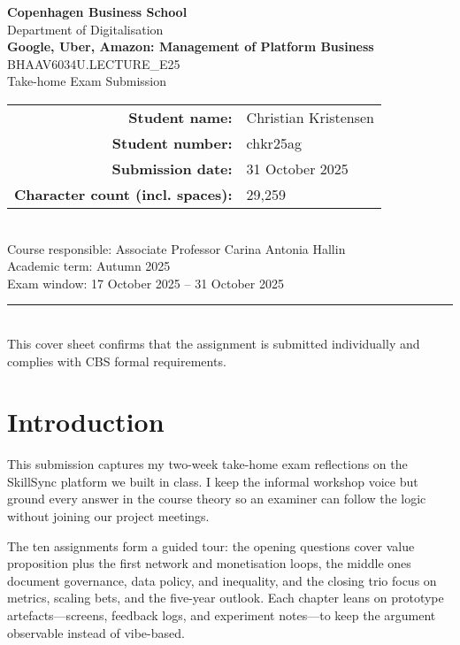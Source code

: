 \documentclass[12pt,a4paper]{article}
\newcommand{\university}{Copenhagen Business School}
\newcommand{\faculty}{Department of Digitalisation}
\newcommand{\examTitle}{Google, Uber, Amazon: Management of Platform Business}
\newcommand{\examCode}{BHAAV6034U.LECTURE\_E25}
\newcommand{\examType}{Take-home Exam Submission}
\newcommand{\studentName}{Christian Kristensen}
\newcommand{\studentId}{chkr25ag}
\newcommand{\submissionDate}{31 October 2025}
\newcommand{\wordCount}{29,259}
\begin{document}
\begin{titlepage}
  \thispagestyle{empty}
  \centering
  {\Large \textbf{\university}}\\[0.5cm]
  {\large \faculty}\\[1.5cm]
  {\LARGE \textbf{\examTitle}}\\[0.5cm]
  {\large \examCode\\\examType}\\[1.5cm]
  \begin{tabular}{rl}
    \textbf{Student name:} & \studentName \\
    \textbf{Student number:} & \studentId \\
    \textbf{Submission date:} & \submissionDate \\
    \textbf{Character count (incl. spaces):} & \wordCount \\
  \end{tabular}\\[1.5cm]
  \vfill
  {\large Course responsible: Associate Professor Carina Antonia Hallin}\\[0.3cm]
  {\large Academic term: Autumn 2025}\\[0.3cm]
  {\large Exam window: 17 October 2025 -- 31 October 2025}\\[1.5cm]
  \rule{0.8\linewidth}{0.4pt}\\[0.5cm]
  {\small This cover sheet confirms that the assignment is submitted individually and complies with CBS formal requirements.}
\end{titlepage}

\setcounter{secnumdepth}{-1}
\makeatletter
\renewcommand{\numberline}[1]{}
\makeatother

\tableofcontents
\newpage

\section*{Introduction}
This submission captures my two-week take-home exam reflections on the SkillSync platform we built in class. I keep the informal workshop voice but ground every answer in the course theory so an examiner can follow the logic without joining our project meetings.

The ten assignments form a guided tour: the opening questions cover value proposition plus the first network and monetisation loops, the middle ones document governance, data policy, and inequality, and the closing trio focus on metrics, scaling bets, and the five-year outlook. Each chapter leans on prototype artefacts---screens, feedback logs, and experiment notes---to keep the argument observable instead of vibe-based.
\end{document}
